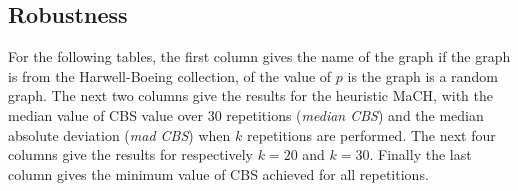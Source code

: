 \documentclass{scrartcl}
\theoremstyle{plain}
\newcommand{\algo}{MaCH}
\newcommand{\cbs}{CBS}
\begin{document}
\clearpage

\subsection{Robustness}

For the following tables, the first column gives the name of the 
graph if the graph is from the Harwell-Boeing collection, of the value of 
$p$ is the graph is a random graph. The next two columns give the results 
for the heuristic \algo{}, with the median value of \cbs{} value over 30 
repetitions (\emph{median \cbs{}}) and the median absolute deviation (\emph{mad 
\cbs{}}) when $k$ repetitions are performed. The next four columns give the 
results for respectively $k=20$ and $k=30$. Finally the last column 
gives the minimum value of \cbs{} achieved for all repetitions.
\end{document}
